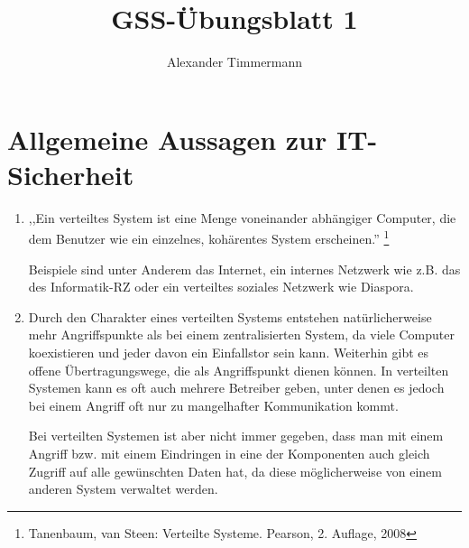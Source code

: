 \documentclass[a4paper,11pt]{scrartcl}
\author{Alexander Timmermann}
\title{GSS-Übungsblatt 1}
\date{}
\begin{document}
\maketitle
\thispagestyle{empty}

\section{Allgemeine Aussagen zur IT-Sicherheit}

\begin{enumerate}[1.]
    \item
        \begin{displayquote}
            ,,Ein verteiltes System ist eine Menge voneinander abhängiger Computer,
            die dem Benutzer wie ein einzelnes, kohärentes System erscheinen.''%
            \footnote{Tanenbaum, van Steen: Verteilte Systeme. Pearson, 2. Auflage, 2008}
        \end{displayquote}

        Beispiele sind unter Anderem das Internet, ein internes Netzwerk wie z.B.
        das des Informatik-RZ oder ein verteiltes soziales Netzwerk wie Diaspora.

    \item Durch den Charakter eines verteilten Systems entstehen natürlicherweise
          mehr Angriffspunkte als bei einem zentralisierten System, da viele Computer
          koexistieren und jeder davon ein Einfallstor sein kann. Weiterhin gibt
          es offene Übertragungswege, die als Angriffspunkt dienen können.
          In verteilten Systemen kann es oft auch mehrere Betreiber geben, unter
          denen es jedoch bei einem Angriff oft nur zu mangelhafter Kommunikation
          kommt.

          Bei verteilten Systemen ist aber nicht immer gegeben, dass man mit einem
          Angriff bzw. mit einem Eindringen in eine der Komponenten auch gleich
          Zugriff auf alle gewünschten Daten hat, da diese möglicherweise von
          einem anderen System verwaltet werden.


\end{enumerate}
\end{document}

